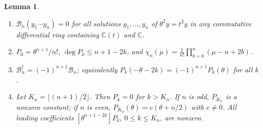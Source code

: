 \documentclass[11pt]{amsart}
\newtheorem{lemma}[thm]{Lemma}
\theoremstyle{definition}
\newcommand{\C}{\mathbb C}
\newcommand{\cB}{\mathcal B}
\begin{document}
\begin{lemma}\label{lem:bessel}
\begin{enumerate}[label=\textup{(\alph*)}]
\item $\cB_n(y_1\cdots y_n)=0$ for all solutions $y_1,\dots,y_n$ of $\theta^2y=t^2y$ in any commutative differential ring containing $\C(t)$ and $\C$.
\item $P_0=\theta^{n+1}/n!$, $\deg P_k\le n+1-2k$, and $\chi_n(\mu)=\frac1{n!}\prod_{b=0}^n(\mu-n+2b)$.
\item $\cB_n^\dagger=(-1)^{n+1}\cB_n$; equivalently $P_k(-\theta-2k)=(-1)^{n+1}P_k(\theta)$ for all $k$.
\item Let $K_n=\lfloor(n+1)/2\rfloor$. Then $P_k=0$ for $k>K_n$. If $n$ is odd, $P_{K_n}$ is a nonzero constant; if $n$ is even, $P_{K_n}(\theta)=c(\theta+n/2)$ with $c\ne0$. All leading coefficients $[\theta^{n+1-2k}]P_k$, $0\le k\le K_n$, are nonzero.
\end{enumerate}
\end{lemma}
\end{document}
